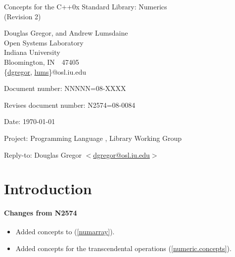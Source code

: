 \documentclass[american,twoside]{book}
\begin{document}
\raggedbottom

\begin{titlepage}
\begin{center}
\huge
Concepts for the C++0x Standard Library: Numerics\\
(Revision 2)

\vspace{0.5in}

\normalsize
Douglas Gregor, and Andrew Lumsdaine \\
Open Systems Laboratory \\
Indiana University \\
Bloomington, IN\ \  47405 \\
\{\href{mailto:dgregor@osl.iu.edu}{dgregor}, \href{mailto:lums@osl.iu.edu}{lums}\}@osl.iu.edu
\end{center}

\vspace{1in}
\par\noindent Document number: NNNNN=08-XXXX\vspace{-6pt}
\par\noindent Revises document number: N2574=08-0084\vspace{-6pt}
\par\noindent Date: \today\vspace{-6pt}
\par\noindent Project: Programming Language \Cpp{}, Library Working Group\vspace{-6pt}
\par\noindent Reply-to: Douglas Gregor $<$\href{mailto:dgregor@osl.iu.edu}{dgregor@osl.iu.edu}$>$\vspace{-6pt}

\section*{Introduction}

\paragraph*{Changes from N2574}
\begin{itemize}
\item Added concepts to  (\ref{numarray}).
\item Added concepts for the transcendental operations (\ref{numeric.concepts}).
\end{itemize}

\end{titlepage}
\end{document}
